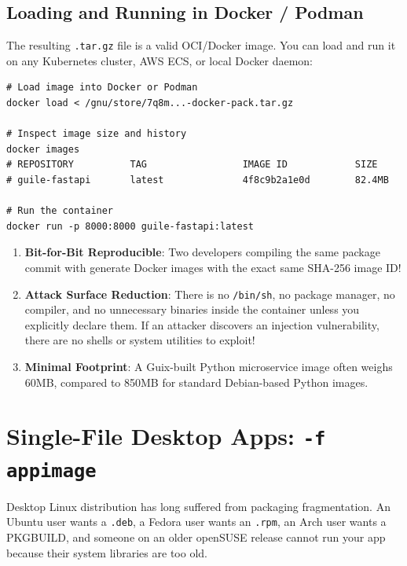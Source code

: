 \subsection{Loading and Running in Docker / Podman}

The resulting \texttt{.tar.gz} file is a valid OCI/Docker image. You can load and run it on any Kubernetes cluster, AWS ECS, or local Docker daemon:

\begin{lstlisting}[style=guixcli]
# Load image into Docker or Podman
docker load < /gnu/store/7q8m...-docker-pack.tar.gz

# Inspect image size and history
docker images
# REPOSITORY          TAG                 IMAGE ID            SIZE
# guile-fastapi       latest              4f8c9b2a1e0d        82.4MB

# Run the container
docker run -p 8000:8000 guile-fastapi:latest
\end{lstlisting}

\begin{alchemybox}
\begin{enumerate}
  \item \textbf{Bit-for-Bit Reproducible}: Two developers compiling the same package commit with  generate Docker images with the exact same SHA-256 image ID!
  \item \textbf{Attack Surface Reduction}: There is no \texttt{/bin/sh}, no package manager, no compiler, and no unnecessary binaries inside the container unless you explicitly declare them. If an attacker discovers an injection vulnerability, there are no shells or system utilities to exploit!
  \item \textbf{Minimal Footprint}: A Guix-built Python microservice image often weighs 60MB, compared to 850MB for standard Debian-based Python images.
\end{enumerate}
\end{alchemybox}

\section{Single-File Desktop Apps: \texttt{-f appimage}}

Desktop Linux distribution has long suffered from packaging fragmentation. An Ubuntu user wants a \texttt{.deb}, a Fedora user wants an \texttt{.rpm}, an Arch user wants a PKGBUILD, and someone on an older openSUSE release cannot run your app because their system libraries are too old.

